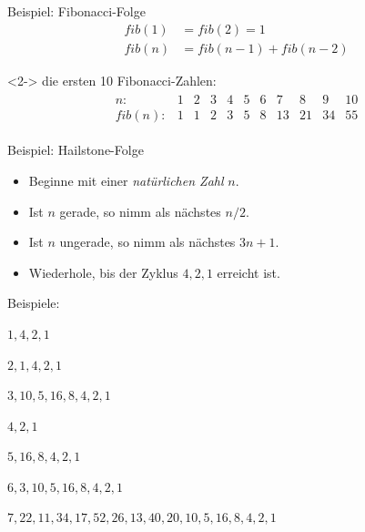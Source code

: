 \begin{fframe}
    \begin{block}
    {Beispiel: Fibonacci-Folge}
    \begin{align*}
        fib(1) &= fib(2) = 1 \\
        fib(n) &= fib(n-1) + fib(n-2)
    \end{align*}
    \end{block}
    \begin{block}<2->
    {die ersten 10 Fibonacci-Zahlen:}
    \begin{align*}
        \begin{array}{r|r|r|r|r|r|r|r|r|r|r}
            n: & 1 & 2 & 3 & 4 & 5 & 6 & 7 & 8 & 9 & 10\\
            \hline
            fib(n): & 1 & 1 & 2 & 3 & 5 & 8 & 13 & 21 & 34 & 55
        \end{array}
    \end{align*}
    \end{block}
\end{fframe}

\begin{fframe}
    \begin{block}
    {Beispiel: Hailstone-Folge}
    \begin{itemize}
        \item Beginne mit einer \emph{natürlichen Zahl} $n$.
        \item Ist $n$ gerade, so nimm als nächstes $n/2$.
        \item Ist $n$ ungerade, so nimm als nächstes $3n+1$.
        \item Wiederhole, bis der Zyklus $4,2,1$ erreicht ist.
    \end{itemize}
    \end{block}
    \begin{block}
    {Beispiele:}
    \begin{description}
        \item<2->[$n = 1$:] $1,4,2,1$
        \item<3->[$n = 2$:] $2,1,4,2,1$
        \item<4->[$n = 3$:] $3,10,5,16,8,4,2,1$
        \item<5->[$n = 4$:] $4,2,1$
        \item<6->[$n = 5$:] $5,16,8,4,2,1$
        \item<7->[$n = 6$:] $6,3,10,5,16,8,4,2,1$
        \item<8->[$n = 7$:] $7,22,11,34,17,52,26,13,40,20,10,5,16,8,4,2,1$
    \end{description}
    \end{block}
\end{fframe}

